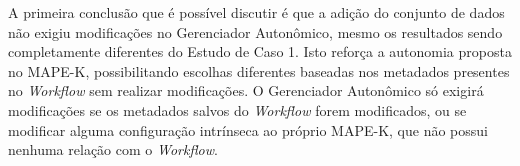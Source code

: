 \documentclass[portugues]{ic-tese}
\begin{document}
\begin{table}[H]
\begin{center}
  \caption{Quantidade de modificações realizadas ao adicionar um novo conjunto de dados ao \textit{Workflow}}
\label{tbl:ManutencaoPipelineDataset}
\end{center}
\end{table}

A primeira conclusão que é possível discutir é que a adição do conjunto de dados não exigiu modificações no Gerenciador Autonômico, mesmo os resultados sendo completamente diferentes do Estudo de Caso 1. Isto reforça a autonomia proposta no MAPE-K, possibilitando escolhas diferentes baseadas nos metadados presentes no \textit{Workflow} sem realizar modificações. O Gerenciador Autonômico só exigirá modificações se os metadados salvos do \textit{Workflow} forem modificados, ou se modificar alguma configuração intrínseca ao próprio MAPE-K, que não possui nenhuma relação com o \textit{Workflow}. 
\end{document}
